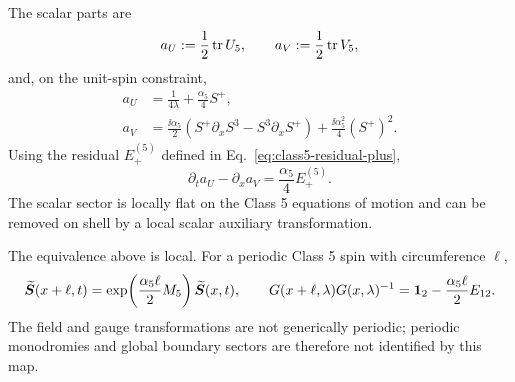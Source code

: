 The scalar parts are
\begin{equation}
a_U:=\frac12\operatorname{tr} U_5,
\qquad
a_V:=\frac12\operatorname{tr} V_5,
\label{eq:class5-known-scalar-parts}
\end{equation}
and, on the unit-spin constraint,
\begin{align}
a_U&=\frac{1}{4\lambda}+\frac{\alpha_5}{4}S^+,
\nonumber\\
a_V&=\frac{\ii\alpha_5}{2}
(S^+\partial_xS^3-S^3\partial_xS^+)
+\frac{\ii\alpha_5^2}{4}(S^+)^2.
\label{eq:class5-known-scalars}
\end{align}
Using the residual $E^{(5)}_+$ defined in
Eq.~\eqref{eq:class5-residual-plus},
\begin{equation}
\partial_ta_U-\partial_xa_V
=\frac{\alpha_5}{4}E^{(5)}_+.
\label{eq:class5-known-scalar-curvature}
\end{equation}
The scalar sector is locally flat on the Class 5 equations of motion and can
be removed on shell by a local scalar auxiliary transformation.

The equivalence above is local.  For a periodic Class 5 spin with
circumference $\ell$,
\begin{equation}
\widetilde{\boldsymbol S}(x+\ell,t)
=\exp\!\left(\frac{\alpha_5\ell}{2}M_5\right)
\widetilde{\boldsymbol S}(x,t),
\qquad
G(x+\ell,\lambda)G(x,\lambda)^{-1}
=\mathbf{1}_2-\frac{\alpha_5\ell}{2}E_{12}.
\label{eq:class5-known-boundary-twist}
\end{equation}
The field and gauge transformations are not generically periodic; periodic
monodromies and global boundary sectors are therefore not identified by this
map.
